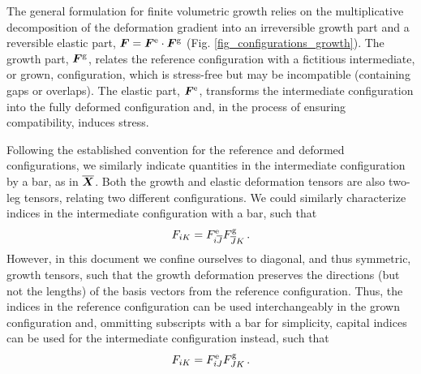 \documentclass[10pt,letterpaper,oneside]{report}
\newcommand{\ten}[1]{\mbox{\boldmath $#1$}{}}
\newcommand{\scas}[1]{\mbox{{\scriptsize{${\rm{#1}}$}}}{}}
\begin{document}
The general formulation for finite volumetric growth relies on the multiplicative decomposition of the deformation gradient \cite{Rodriguez1994} into an irreversible growth part and a reversible elastic part, $\ten{F} = \ten{F}^{\scas{e}} \cdot \ten{F}^{\scas{g}}$ (Fig. \ref{fig_configurations_growth}).  The growth part, $\ten{F}^{\scas{g}}$, relates the reference configuration with a fictitious intermediate, or grown, configuration, which is stress-free but may be incompatible (containing gaps or overlaps).  The elastic part, $\ten{F}^{\scas{e}}$, transforms the intermediate configuration into the fully deformed configuration and, in the process of ensuring compatibility, induces stress.  

Following the established convention for the reference and deformed configurations, we similarly indicate quantities in the intermediate configuration by a bar, as in $\overline{\ten{X}}$.  
Both the growth and elastic deformation tensors are also two-leg tensors, relating two different configurations.  We could similarly characterize indices in the intermediate configuration with a bar, such that 
\begin{equation}
F_{iK} = F^{\scas{e}}_{i\overline{J}} F^{\scas{g}}_{\overline{J} K} \, .
\end{equation}
However, in this document we confine ourselves to diagonal, and thus symmetric, growth tensors, such that the growth deformation preserves the directions (but not the lengths) of the basis vectors from the reference configuration.  Thus, the indices in the reference configuration can be used interchangeably in the grown configuration and, ommitting subscripts with a bar for simplicity, capital indices can be used for the intermediate configuration instead, such that
\begin{equation}
F_{iK} = F^{\scas{e}}_{iJ} F^{\scas{g}}_{JK} \, .  
\end{equation}
\end{document}
